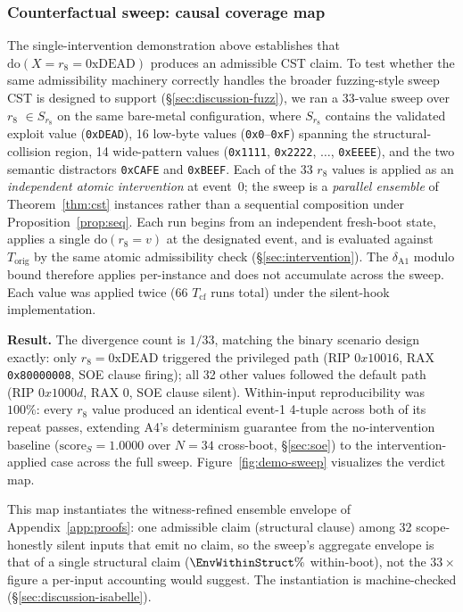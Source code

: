 \documentclass[conference]{IEEEtran}
\newcommand{\Korig}{T_\text{orig}}
\newcommand{\Tcf}{T_\text{cf}}
\newcommand{\scoreS}{\text{score}_S}
\newcommand{\dox}[1]{\text{do}(X{=}#1)}
\begin{document}
\subsubsection{Counterfactual sweep: causal coverage map}
\label{sec:eval-demo-sweep}

The single-intervention demonstration above establishes that
$\dox{r_8{=}\text{0xDEAD}}$ produces an admissible CST claim. To
test whether the same admissibility machinery correctly handles
the broader fuzzing-style sweep CST is designed to support
(\S\ref{sec:discussion-fuzz}), we ran a 33-value sweep over $r_8$
$\in S_{r_8}$ on the same bare-metal configuration, where
$S_{r_8}$ contains the validated exploit value
(\texttt{0xDEAD}), 16 low-byte values (\texttt{0x0}--\texttt{0xF})
spanning the structural-collision region, 14 wide-pattern values
(\texttt{0x1111}, \texttt{0x2222}, $\ldots$, \texttt{0xEEEE}),
and the two semantic distractors \texttt{0xCAFE} and
\texttt{0xBEEF}. Each of the 33 $r_8$ values is applied as an
\emph{independent atomic intervention} at event~0; the sweep is a
\emph{parallel ensemble} of Theorem~\ref{thm:cst} instances rather
than a sequential composition under Proposition~\ref{prop:seq}. Each run begins
from an independent fresh-boot state, applies a single
$\text{do}(r_8{=}v)$ at the designated event, and is evaluated
against $\Korig$ by the same atomic admissibility check
(\S\ref{sec:intervention}). The $\delta_{\text{A1}}$ modulo bound
therefore applies per-instance and does not accumulate across the
sweep. Each value was applied twice (66 $\Tcf$ runs total) under
the silent-hook implementation.

\textbf{Result.} The divergence count is $1/33$, matching the
binary scenario design exactly: only $r_8 = \text{0xDEAD}$
triggered the privileged path (RIP $0x10016$, RAX
\texttt{0x80000008}, SOE clause firing); all 32 other values
followed the default path (RIP $0x1000d$, RAX 0, SOE clause
silent). Within-input reproducibility was $100\%$: every $r_8$
value produced an identical event-1 4-tuple across both of its
repeat passes, extending A4's determinism guarantee from the
no-intervention baseline ($\scoreS{=}1.0000$ over $N{=}34$
cross-boot, \S\ref{sec:soe}) to the intervention-applied case
across the full sweep. Figure~\ref{fig:demo-sweep} visualizes the
verdict map.

This map instantiates the witness-refined ensemble envelope of
Appendix~\ref{app:proofs}: one admissible claim (structural clause)
among 32 scope-honestly silent inputs that emit no claim, so the
sweep's aggregate envelope is that of a single structural claim
($\EnvWithinStruct\%$ within-boot), not the $33{\times}$ figure a per-input
accounting would suggest. The instantiation is machine-checked
(\S\ref{sec:discussion-isabelle}).
\end{document}

